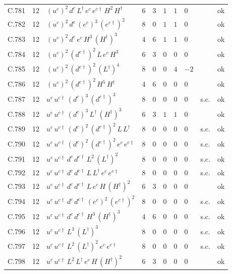 {\begin{longtable}{@{}ll>{\raggedright\arraybackslash}p{6.4cm}rrllllr@{}}
C.781 & 12 & $(u^c)^{2}\,d^c\,L^\dagger\,e^c\,e^{c\dagger}\,H^{2}\,H^\dagger$ & 6 & 3 & $1$ & $1$ & $0$ &  & ok \\
C.782 & 12 & $(u^c)^{2}\,d^c\,(e^c)^{3}\,(e^{c\dagger})^{2}$ & 8 & 0 & $1$ & $1$ & $0$ &  & ok \\
C.783 & 12 & $(u^c)^{2}\,d^c\,e^c\,H^{3}\,(H^\dagger)^{3}$ & 4 & 6 & $1$ & $1$ & $0$ &  & ok \\
C.784 & 12 & $(u^c)^{2}\,(d^{c\dagger})^{2}\,L\,e^c\,H^{3}$ & 6 & 3 & $0$ & $0$ & $0$ &  & ok \\
C.785 & 12 & $(u^c)^{2}\,(d^{c\dagger})^{2}\,(L^\dagger)^{4}$ & 8 & 0 & $0$ & $4$ & $-2$ &  & ok \\
C.786 & 12 & $(u^c)^{2}\,(d^{c\dagger})^{2}\,H^{5}\,H^\dagger$ & 4 & 6 & $0$ & $0$ & $0$ &  & ok \\
C.787 & 12 & $u^c\,u^{c\dagger}\,(d^c)^{3}\,(d^{c\dagger})^{3}$ & 8 & 0 & $0$ & $0$ & $0$ & s.c. & ok \\
C.788 & 12 & $u^c\,u^{c\dagger}\,(d^c)^{3}\,L^\dagger\,(H^\dagger)^{3}$ & 6 & 3 & $1$ & $1$ & $0$ &  & ok \\
C.789 & 12 & $u^c\,u^{c\dagger}\,(d^c)^{2}\,(d^{c\dagger})^{2}\,L\,L^\dagger$ & 8 & 0 & $0$ & $0$ & $0$ & s.c. & ok \\
C.790 & 12 & $u^c\,u^{c\dagger}\,(d^c)^{2}\,(d^{c\dagger})^{2}\,e^c\,e^{c\dagger}$ & 8 & 0 & $0$ & $0$ & $0$ & s.c. & ok \\
C.791 & 12 & $u^c\,u^{c\dagger}\,d^c\,d^{c\dagger}\,L^{2}\,(L^\dagger)^{2}$ & 8 & 0 & $0$ & $0$ & $0$ & s.c. & ok \\
C.792 & 12 & $u^c\,u^{c\dagger}\,d^c\,d^{c\dagger}\,L\,L^\dagger\,e^c\,e^{c\dagger}$ & 8 & 0 & $0$ & $0$ & $0$ & s.c. & ok \\
C.793 & 12 & $u^c\,u^{c\dagger}\,d^c\,d^{c\dagger}\,L\,e^c\,H\,(H^\dagger)^{2}$ & 6 & 3 & $0$ & $0$ & $0$ &  & ok \\
C.794 & 12 & $u^c\,u^{c\dagger}\,d^c\,d^{c\dagger}\,(e^c)^{2}\,(e^{c\dagger})^{2}$ & 8 & 0 & $0$ & $0$ & $0$ & s.c. & ok \\
C.795 & 12 & $u^c\,u^{c\dagger}\,d^c\,d^{c\dagger}\,H^{3}\,(H^\dagger)^{3}$ & 4 & 6 & $0$ & $0$ & $0$ & s.c. & ok \\
C.796 & 12 & $u^c\,u^{c\dagger}\,L^{3}\,(L^\dagger)^{3}$ & 8 & 0 & $0$ & $0$ & $0$ & s.c. & ok \\
C.797 & 12 & $u^c\,u^{c\dagger}\,L^{2}\,(L^\dagger)^{2}\,e^c\,e^{c\dagger}$ & 8 & 0 & $0$ & $0$ & $0$ & s.c. & ok \\
C.798 & 12 & $u^c\,u^{c\dagger}\,L^{2}\,L^\dagger\,e^c\,H\,(H^\dagger)^{2}$ & 6 & 3 & $0$ & $0$ & $0$ &  & ok \\

\end{longtable}}
